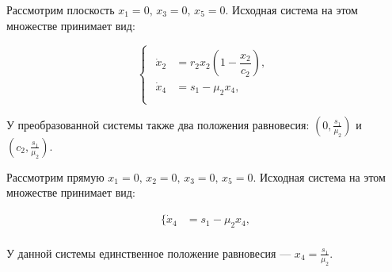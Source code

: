 \documentclass[12pt,a4paper]{extarticle}
\theoremstyle{definition}
\theoremstyle{definition}
\theoremstyle{definition}
\begin{document}
	Рассмотрим плоскость $x_1=0,\, x_3=0,\, x_5=0$. Исходная система на этом множестве принимает вид:
	
	\begin{equation*}
		\begin{cases}
			\begin{aligned}
				\dot{x}_2 &= r_2x_2\left(1-\dfrac{x_2}{c_2}\right),\\
				\dot{x}_4 &= s_1 -\mu_2x_4,\\
			\end{aligned}
		\end{cases}
	\end{equation*}
	
	У преобразованной системы также два положения равновесия: $\left(0,\frac{s_1}{\mu_2}\right)$ и $\left(c_2,\frac{s_1}{\mu_2}\right)$.
	
	Рассмотрим прямую $x_1=0,\, x_2=0,\, x_3=0,\, x_5=0$. Исходная система на этом множестве принимает вид:
	
	\begin{equation*}
		\begin{aligned}
			\{\dot{x}_4 &= s_1 -\mu_2x_4,\\
		\end{aligned}
	\end{equation*}
	
	У данной системы единственное положение равновесия --- $x_4=\frac{s_1}{\mu_2}$.
	
\end{document}
